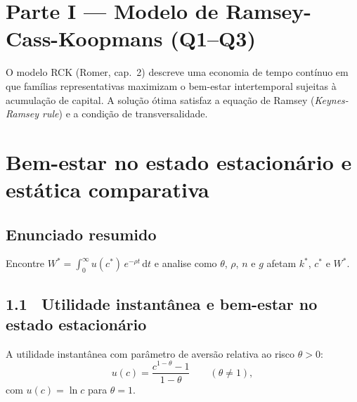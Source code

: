 \documentclass[12pt, a4paper]{article}
\newcommand{\dif}{\mathrm{d}}
\newcommand{\kstar}{k^*}
\newcommand{\cstar}{c^*}
\begin{document}
\newpage
\tableofcontents
\newpage


\section*{\large\color{cyanrbc} Parte I --- Modelo de Ramsey-Cass-Koopmans (Q1--Q3)}

O modelo RCK (Romer, cap.\ 2) descreve uma economia de tempo contínuo em que famílias
representativas maximizam o bem-estar intertemporal sujeitas à acumulação de capital.
A solução ótima satisfaz a equação de Ramsey (\textit{Keynes-Ramsey rule}) e a condição
de transversalidade.

\bigskip

\setcounter{section}{0}
\section{Bem-estar no estado estacionário e estática comparativa}

\subsection*{Enunciado resumido}
Encontre $W^* = \int_0^\infty u(c^*)\,e^{-\rho t}\,\dif t$ e analise como
$\theta$, $\rho$, $n$ e $g$ afetam $\kstar$, $\cstar$ e $W^*$.

\subsection*{1.1 \ Utilidade instantânea e bem-estar no estado estacionário}

A utilidade instantânea com parâmetro de aversão relativa ao risco $\theta > 0$:
\begin{equation}
u(c) = \frac{c^{1-\theta} - 1}{1-\theta} \qquad (\theta \neq 1),
\label{eq:crra}
\end{equation}
com $u(c) = \ln c$ para $\theta = 1$.
\end{document}
